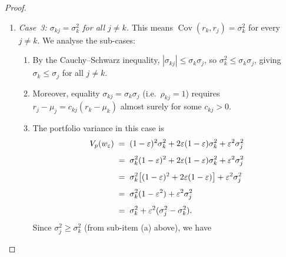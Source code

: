 \documentclass[12pt,openany]{book}
\newcommand{\bfw}{\mathbf{w}}
\DeclareMathOperator{\Cov}{Cov}
\numberwithin{equation}{chapter}
\theoremstyle{plain}
\theoremstyle{definition}
\theoremstyle{remark}
\def\bfw{w}%
\begin{document}
\begin{proof}
\begin{enumerate}
\begin{enumerate}
          \item \emph{Case~3: $\sigma_{kj} = \sigma_k^2$ for all
                $j \neq k$.}
                This means $\Cov(r_k, r_j) = \sigma_k^2$ for
                every $j \neq k$.  We analyse the sub-cases:
                \begin{enumerate}
                  \item By the Cauchy--Schwarz inequality,
                        $|\sigma_{kj}| \leq \sigma_k \sigma_j$,
                        so $\sigma_k^2 \leq \sigma_k \sigma_j$,
                        giving $\sigma_k \leq \sigma_j$ for all
                        $j \neq k$.
                  \item Moreover, equality
                        $\sigma_{kj} = \sigma_k \sigma_j$
                        (i.e.\ $\rho_{kj} = 1$) requires
                        $r_j - \mu_j = c_{kj}(r_k - \mu_k)$
                        almost surely for some $c_{kj} > 0$.
                  \item The portfolio variance in this case is
                        \begin{align}
                          V_p(\bfw_\varepsilon)
                          &\;=\; (1-\varepsilon)^2\sigma_k^2
                                 + 2\varepsilon(1-\varepsilon)\sigma_k^2
                                 + \varepsilon^2\sigma_j^2
                          \notag\\[4pt]
                          &\;=\; \sigma_k^2(1-\varepsilon)^2
                                 + 2\varepsilon(1-\varepsilon)\sigma_k^2
                                 + \varepsilon^2\sigma_j^2
                          \notag\\[4pt]
                          &\;=\; \sigma_k^2
                                 \bigl[(1-\varepsilon)^2
                                       + 2\varepsilon(1-\varepsilon)\bigr]
                                 + \varepsilon^2\sigma_j^2
                          \notag\\[4pt]
                          &\;=\; \sigma_k^2(1-\varepsilon^2)
                                 + \varepsilon^2\sigma_j^2
                          \notag\\[4pt]
                          &\;=\; \sigma_k^2
                                 + \varepsilon^2(\sigma_j^2 - \sigma_k^2).
                          \label{eq:nc-case3-var}
                        \end{align}
                        Since $\sigma_j^2 \geq \sigma_k^2$ (from
                        sub-item (a) above), we have

\end{enumerate}
\end{enumerate}
\end{enumerate}
\end{proof}
\end{document}
